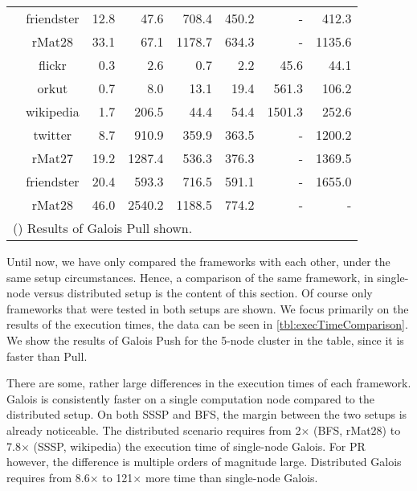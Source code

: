 \begin{table}
\begin{tabular}{ccr@{\tabskip 1 \tabcolsep}r
	r@{\tabskip 1 \tabcolsep}r
	r@{\tabskip 1 \tabcolsep}r}
		& friendster & 12.8 & 47.6 & 708.4 & 450.2 & - & 412.3 \\
		& rMat28 & 33.1 & 67.1 & 1178.7 & 634.3 & - & 1135.6 \\
		\midrule
		\multirow{7}{0.5ex}{\rotatebox{90}{\bf PR}}& flickr & 0.3\txtdagger & 2.6 & 0.7 & 2.2 & 45.6 & 44.1 \\
		& orkut & 0.7\txtdagger & 8.0 & 13.1 & 19.4 & 561.3 & 106.2 \\
		& wikipedia & 1.7\txtdagger & 206.5 & 44.4 & 54.4 & 1501.3 & 252.6 \\
		& twitter & 8.7\txtdagger & 910.9 & 359.9 & 363.5 & - & 1200.2 \\
		& rMat27 & 19.2\txtdagger & 1287.4 & 536.3 & 376.3 & - & 1369.5 \\
		& friendster & 20.4\txtdagger & 593.3 & 716.5 & 591.1 & - & 1655.0 \\
		& rMat28 & 46.0\txtdagger & 2540.2 & 1188.5 & 774.2 & - & - \\
		\bottomrule
		\multicolumn{8}{l}{(\txtdagger) Results of Galois Pull shown.}
	\end{tabular}
\end{table}
Until now, we have only compared the frameworks with each other, under the same setup circumstances. Hence, a comparison of the same framework, in single-node versus distributed setup is the content of this section.
Of course only frameworks that were tested in both setups are shown.
We focus primarily on the results of the execution times, the data can be seen in \autoref{tbl:execTimeComparison}. We show the results of Galois Push for the 5-node cluster in the table, since it is faster than Pull.

There are some, rather large differences in the execution times of each framework. Galois is consistently faster on a single computation node compared to the distributed setup. 
On both SSSP and BFS, the margin between the two setups is already noticeable. The distributed scenario requires from 2$\times$ (BFS, rMat28) to 7.8$\times$ (SSSP, wikipedia) the execution time of single-node Galois.
For PR however, the difference is multiple orders of magnitude large. Distributed Galois requires from 8.6$\times$ to 121$\times$ more time than single-node Galois. 

